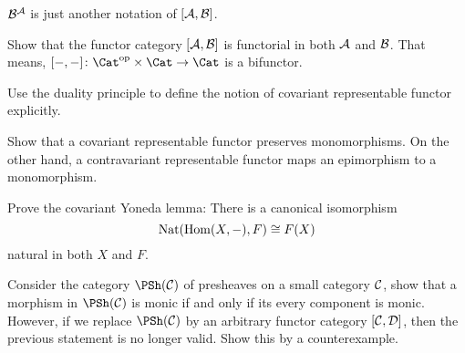 \begin{rec}
  ${\cal B}^{{\cal A}}$ is just another notation of $[{\cal A},{\cal B}]$.
\end{rec}
\begin{ex}
  Show that the functor category $[{\cal A},{\cal B}]$ is functorial in both ${\cal A}$ and ${\cal B}$. That means, $[-,-]\colon\Cat^{\op}\times\Cat\to\Cat$ is a bifunctor.
\end{ex}
\begin{ex}
  Use the duality principle to define the notion of covariant representable functor explicitly.
\end{ex}
\begin{ex}
  Show that a covariant representable functor preserves monomorphisms. On the other hand, a contravariant representable functor maps an epimorphism to a monomorphism.
\end{ex}
\begin{ex}
  Prove the covariant Yoneda lemma: There is a canonical isomorphism
    \begin{equation*}
      \operatorname{Nat}(\operatorname{Hom}(X,-),F)\cong F(X)
    \end{equation*}
    natural in both $X$ and $F$.
\end{ex}
\begin{ex}
  Consider the category $\PSh(\Cc)$ of presheaves on a small category ${\cal C}$, show that a morphism in $\PSh(\Cc)$ is monic if and only if its every component is monic.
  However, if we replace $\PSh(\Cc)$ by an arbitrary functor category $[{\cal C},{\cal D}]$, then the previous statement is no longer valid. Show this by a counterexample.
\end{ex}
